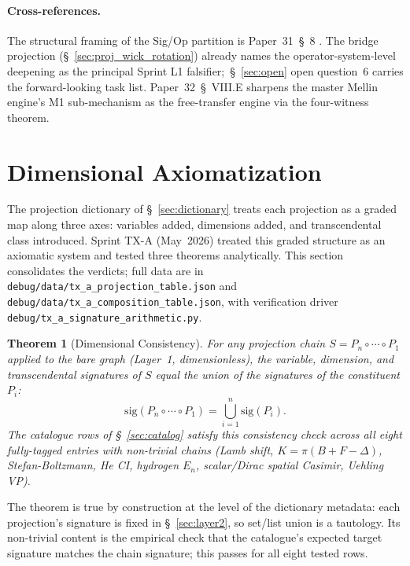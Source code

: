 \documentclass[11pt]{article}
\newtheorem{theorem}{Theorem}
\begin{document}
\paragraph{Cross-references.}
The structural framing of the Sig/Op partition is Paper~31~\S~8
\cite{paper31}.  The bridge projection (\S~\ref{sec:proj_wick_rotation})
already names the operator-system-level deepening as the principal
Sprint L1 falsifier;\ \S~\ref{sec:open} open question~6 carries the
forward-looking task list.  Paper~32~\S~VIII.E sharpens the master
Mellin engine's M1 sub-mechanism as the free-transfer engine via the
four-witness theorem.

\section{Dimensional Axiomatization}
\label{sec:axiomatization}

The projection dictionary of \S~\ref{sec:dictionary} treats each
projection as a graded map along three axes: variables added,
dimensions added, and transcendental class introduced.  Sprint TX-A
(May~2026) treated this graded structure as an axiomatic system and
tested three theorems analytically.  This section consolidates the
verdicts; full data are in
\texttt{debug/data/tx\_a\_projection\_table.json} and
\texttt{debug/data/tx\_a\_composition\_table.json}, with verification
driver \texttt{debug/tx\_a\_signature\_arithmetic.py}.

\begin{theorem}[Dimensional Consistency]
\label{thm:dimensional_consistency}
For any projection chain $S = P_n \circ \cdots \circ P_1$ applied to
the bare graph (Layer~1, dimensionless), the variable, dimension, and
transcendental signatures of $S$ equal the union of the signatures of
the constituent $P_i$:
\[
  \mathrm{sig}(P_n \circ \cdots \circ P_1)
   = \bigcup_{i=1}^{n} \mathrm{sig}(P_i).
\]
The catalogue rows of \S~\ref{sec:catalog} satisfy this consistency
check across all eight fully-tagged entries with non-trivial chains
(Lamb shift, $K = \pi(B + F - \Delta)$, Stefan-Boltzmann, He CI,
hydrogen $E_n$, scalar/Dirac spatial Casimir, Uehling VP).
\end{theorem}

The theorem is true by construction at the level of the dictionary
metadata: each projection's signature is fixed in
\S~\ref{sec:layer2}, so set/list union is a tautology.  Its
non-trivial content is the empirical check that the catalogue's
expected target signature matches the chain signature; this passes
for all eight tested rows.
\end{document}
